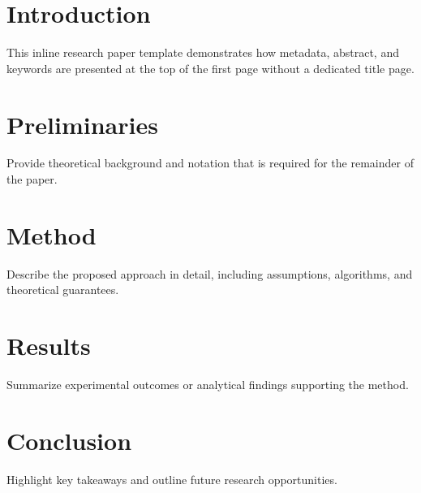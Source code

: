 \documentclass[
    language=english,
    doctype=inlinepaper,
    institution=none,
    titlestyle=book,
]{../../omnilatex}
\begin{document}
\maketitle

\section{Introduction}
This inline research paper template demonstrates how metadata, abstract, and
keywords are presented at the top of the first page without a dedicated title
page.

\section{Preliminaries}
Provide theoretical background and notation that is required for the remainder
of the paper.

\section{Method}
Describe the proposed approach in detail, including assumptions, algorithms,
and theoretical guarantees.

\section{Results}
Summarize experimental outcomes or analytical findings supporting the method.

\section{Conclusion}
Highlight key takeaways and outline future research opportunities.

\printbibliography
\end{document}
